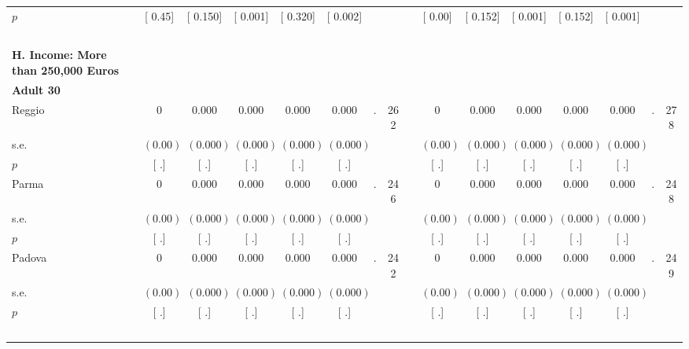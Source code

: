 \begin{longtable}{L{8em} c c c c c c c p{1em} c c c c c c c}
\quad \quad \quad \quad $ p$ & [     0.45] & [    0.150] & [    0.001] & [    0.320] & [    0.002] & & & & [     0.00] & [    0.152] & [    0.001] & [    0.152] & [    0.001] & &  \\[1em]
~\\[1em]
\textbf{H. Income: More than 250,000 Euros} \\*
\quad \quad \textbf{Adult 30} & & & & & & & & & & & & & & & \\* 
\quad \quad \quad Reggio& 0 &     0.000 &     0.000 &     0.000 &     0.000 &         . &       262 & & 0 &     0.000 &     0.000 &     0.000 &     0.000 &         . &       278  \\*
\quad \quad \quad \quad s.e.& $ (     0.00)$ & $ (    0.000)$ & $ (    0.000)$ & $ (    0.000)$ & $ (    0.000)$ & & & & $ (     0.00)$ & $ (    0.000)$ & $ (    0.000)$ & $ (    0.000)$ & $ (    0.000)$ & &  \\*
\quad \quad \quad \quad $ p$ & [        .] & [        .] & [        .] & [        .] & [        .] & & & & [        .] & [        .] & [        .] & [        .] & [        .] & &  \\[1em]
\quad \quad \quad Parma& 0 &     0.000 &     0.000 &     0.000 &     0.000 &         . &       246 & & 0 &     0.000 &     0.000 &     0.000 &     0.000 &         . &       248  \\*
\quad \quad \quad \quad s.e.& $ (     0.00)$ & $ (    0.000)$ & $ (    0.000)$ & $ (    0.000)$ & $ (    0.000)$ & & & & $ (     0.00)$ & $ (    0.000)$ & $ (    0.000)$ & $ (    0.000)$ & $ (    0.000)$ & &  \\*
\quad \quad \quad \quad $ p$ & [        .] & [        .] & [        .] & [        .] & [        .] & & & & [        .] & [        .] & [        .] & [        .] & [        .] & &  \\[1em]
\quad \quad \quad Padova& 0 &     0.000 &     0.000 &     0.000 &     0.000 &         . &       242 & & 0 &     0.000 &     0.000 &     0.000 &     0.000 &         . &       249  \\*
\quad \quad \quad \quad s.e.& $ (     0.00)$ & $ (    0.000)$ & $ (    0.000)$ & $ (    0.000)$ & $ (    0.000)$ & & & & $ (     0.00)$ & $ (    0.000)$ & $ (    0.000)$ & $ (    0.000)$ & $ (    0.000)$ & &  \\*
\quad \quad \quad \quad $ p$ & [        .] & [        .] & [        .] & [        .] & [        .] & & & & [        .] & [        .] & [        .] & [        .] & [        .] & &  \\[1em]
~\\[1em]

\end{longtable}
